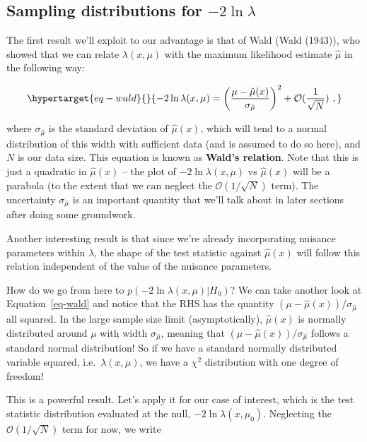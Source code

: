 \documentclass[
  11pt,
  numbers=noendperiod]{book}
\begin{document}
\hypertarget{sec-sampling}{%
\subsection{\texorpdfstring{Sampling distributions for
\(-2 \ln \lambda\)}{Sampling distributions for -2 \textbackslash ln \textbackslash lambda}}\label{sec-sampling}}

The first result we'll exploit to our advantage is that of Wald (Wald
(1943)), who showed that we can relate \(\lambda(x,\mu)\) with the
maximum likelihood estimate \(\hat{\mu}\) in the following way:

\begin{equation}\protect\hypertarget{eq-wald}{}{
-2\ln \lambda(x,\mu) = \left(\frac{\mu - \hat{\mu}(x)}{\sigma_{\hat{\mu}}}\right)^2 + \mathcal{O}(\frac{1}{\sqrt{N}})~,
}\label{eq-wald}\end{equation}

where \(\sigma_{\hat{\mu}}\) is the standard deviation of
\(\hat{\mu}(x)\), which will tend to a normal distribution of this width
with sufficient data (and is assumed to do so here), and \(N\) is our
data size. This equation is known as \textbf{Wald's relation}. Note that
this is just a quadratic in \(\hat{\mu}(x)\) -- the plot of
\(-2\ln \lambda(x,\mu)\) vs \(\hat{\mu}(x)\) will be a parabola (to the
extent that we can neglect the \(\mathcal{O}(1/ \sqrt{N})\) term). The
uncertainty \(\sigma_{\hat{\mu}}\) is an important quantity that we'll
talk about in later sections after doing some groundwork.

Another interesting result is that since we're already incorporating
nuisance parameters within \(\lambda\), the shape of the test statistic
against \(\hat{\mu}(x)\) will follow this relation independent of the
value of the nuisance parameters.

How do we go from here to \(p(-2\ln \lambda(x,\mu) | H_0)\)? We can take
another look at Equation~\ref{eq-wald} and notice that the RHS has the
quantity \((\mu - \hat{\mu}(x))/\sigma_{\hat{\mu}}\) all squared. In the
large sample size limit (asymptotically), \(\hat{\mu}(x)\) is normally
distributed around \(\mu\) with width \(\sigma_{\hat{\mu}}\), meaning
that \((\mu - \hat{\mu}(x))/\sigma_{\hat{\mu}}\) follows a standard
normal distribution! So if we have a standard normally distributed
variable squared, i.e.~\(\lambda(x,\mu)\), we have a \(\chi^2\)
distribution with one degree of freedom!

This is a powerful result. Let's apply it for our case of interest,
which is the test statistic distribution evaluated at the null,
\(-2\ln \lambda(x,\mu_0)\). Neglecting the \(\mathcal{O}(1/ \sqrt{N})\)
term for now, we write
\end{document}
